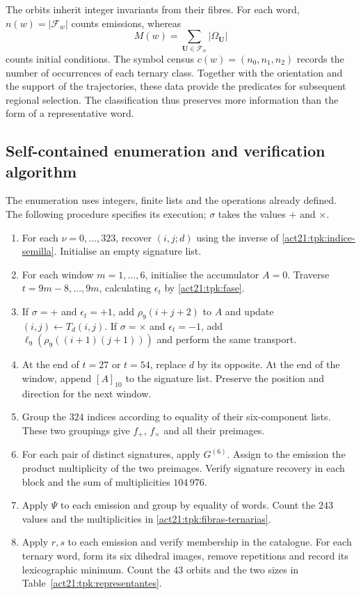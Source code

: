The orbits inherit integer invariants from their fibres. For each word,
\(n(w)=|\mathcal F_w|\) counts emissions, whereas
\[
 M(w)=\sum_{\mathbf U\in\mathcal F_w}|\Omega_{\mathbf U}|
\]
counts initial conditions. The symbol census \(c(w)=(n_0,n_1,n_2)\)
records the number of occurrences of each ternary class.
Together with the orientation and the support of the trajectories,
these data provide the predicates for subsequent regional selection.
The classification thus preserves more information than the form of a
representative word.

\subsection{Self-contained enumeration and verification algorithm}
\label{act21:tpk:algoritmo}

The enumeration uses integers, finite lists and the operations already
defined. The following procedure specifies its execution; \(\sigma\)
takes the values \(+\) and \(\times\).

\begin{enumerate}
\item For each \(\nu=0,\ldots,323\), recover \((i,j;d)\) using the
inverse of \eqref{act21:tpk:indice-semilla}. Initialise an empty signature list.
\item For each window \(m=1,\ldots,6\), initialise the accumulator
\(A=0\). Traverse \(t=9m-8,\ldots,9m\), calculating \(\epsilon_t\)
by \eqref{act21:tpk:fase}.
\item If \(\sigma=+\) and \(\epsilon_t=+1\), add
\(\rho_9(i+j+2)\) to \(A\) and update
\((i,j)\leftarrow T_d(i,j)\). If \(\sigma=\times\) and
\(\epsilon_t=-1\), add
\(\ell_9(\rho_9((i+1)(j+1)))\) and perform the same transport.
\item At the end of \(t=27\) or \(t=54\), replace \(d\) by its
opposite. At the end of the window, append \([A]_{10}\) to the
signature list. Preserve the position and direction for the next window.
\item Group the \(324\) indices according to equality of their
six-component lists. These two groupings give \(f_+\), \(f_\times\)
and all their preimages.
\item For each pair of distinct signatures, apply \(G^{(6)}\).
Assign to the emission the product multiplicity of the two preimages.
Verify signature recovery in each block and the sum of multiplicities
\(104\,976\).
\item Apply \(\Psi\) to each emission and group by equality of words.
Count the \(243\) values and the multiplicities in
\eqref{act21:tpk:fibras-ternarias}.
\item Apply \(r,s\) to each emission and verify membership in the
catalogue. For each ternary word, form its six dihedral images, remove
repetitions and record its lexicographic minimum. Count the \(43\)
orbits and the two sizes in Table~\ref{act21:tpk:representantes}.
\end{enumerate}

